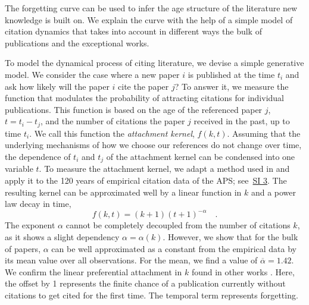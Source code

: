 \documentclass[fleqn,10pt]{wlscirep}
\begin{document}
The forgetting curve can be used to infer the age structure of the literature new knowledge is built on. We explain the curve with the help of a simple model of citation dynamics that takes into account in different ways the bulk of  publications and the exceptional works. 


To model the dynamical process of citing literature, we devise a simple generative model. We consider the case where a new paper $i$ is published at the time $t_i$ and ask how likely will the paper $i$ cite the paper $j$? To answer it, we measure the function that modulates the  probability of attracting citations for individual publications. This function is based on the age of the referenced paper $j$, $t = t_i - t_j$, and the number of citations the paper $j$ received in the past, up to time $t_i$. We call this function the {\em attachment kernel},  $f(k,t)$. Assuming that the underlying mechanisms of how we choose our references do not change over time, the dependence of $t_i$ and $t_j$ of the attachment kernel can be condensed into one variable $t$. To measure the attachment kernel, we adapt a method used in \cite{Newman2001} and apply it to the 120 years of empirical citation data of the APS; see~\hyperref[SI3]{SI 3}. The resulting kernel can be approximated well by a linear function in $k$ and a power law decay in time,
%
\begin{equation}
   f(k, t)= (k+1)(t+1)^{-\alpha} \quad.
\end{equation}
%
The exponent $\alpha$ cannot be completely decoupled from the number of citations $k$, as it shows a slight dependency $\alpha = \alpha(k) $. However, we show that for the bulk of papers, $\alpha$ can be well approximated as a constant from the empirical data by its mean value over all observations. For the mean, we find a value of $\overline{\alpha} = 1.42$.  We confirm the linear preferential attachment in $k$ found in other works \cite{Jeong_2003}. Here, the offset by 1 represents the finite chance of a publication currently without citations to get cited for the first time. The temporal term represents forgetting.
\end{document}
